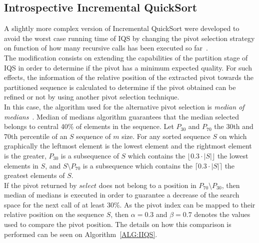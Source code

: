 \subsection{Introspective Incremental QuickSort}
\label{SUBSECTION:IIQS}

A slightly more complex version of Incremental QuickSort were developed to avoid the worst case running time of IQS by changing the pivot selection strategy on function of how many recursive calls has been executed so far~\cite{7416566}.\\

The modification consists on extending the capabilities of the partition stage of IQS in order to determine if the pivot has a minimum expected quality. For such effects, the information of the relative position of the extracted pivot towards the partitioned sequence is calculated to determine if the pivot obtained can be refined or not by using another pivot selection technique.\\

In this case, the algorithm used for the alternative pivot selection is \textit{median of medians}~\cite{Blum_Floyd_Pratt_Rivest_Tarjan_1973}. Median of medians algorithm guarantees that the median selected belongs to central 40\% of elements in the sequence. Let $P_{30}$ and $P_{70}$ the 30th and 70th percentile of an $S$ sequence of $m$ size. For any sorted sequence $S$ on which graphically the leftmost element is the lowest element and the rightmost element is the greater, $P_{30}$ is a subsequence of $S$ which contains the $\lfloor0.3\cdot|S|\rfloor$ the lowest elements in $S$, and $S \setminus P_{70}$ is a subsequence which contains the $\lceil0.3\cdot|S|\rceil$ the greatest elements of $S$.\\

If the pivot returned by $select$ does not belong to a position in $P_{70} \setminus P_{30}$, then median of medians is executed in order to guarantee a decrease of the search space for the next call of at least 30\%. As the pivot index can be mapped to their relative position on the sequence $S$, then $\alpha=0.3$ and $\beta=0.7$ denotes the values used to compare the pivot position. The details on how this comparison is performed can be seen on Algorithm~\ref{ALG:IIQS}.\\

